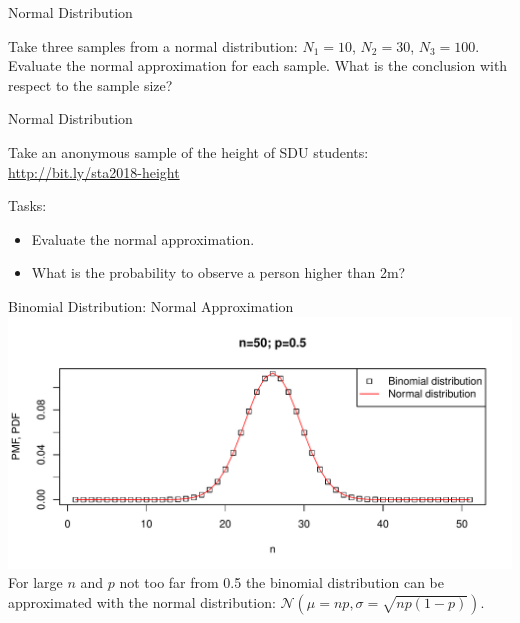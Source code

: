 \begin{frame}{Normal Distribution}
    \begin{example}
        \medskip
        Take three samples from a normal distribution: $N_1 = 10$, $N_2 = 30$, $N_3 = 100$. Evaluate the normal approximation for each sample. What is the conclusion with respect to the sample size?
    \end{example}
\end{frame}

\begin{frame}{Normal Distribution}
    \begin{example}
        \medskip
        Take an anonymous sample of the height of SDU students:\\
        \url{http://bit.ly/sta2018-height}
        
        Tasks:
        \begin{itemize}
            \item Evaluate the normal approximation.
            \item What is the probability to observe a person higher than 2m?
        \end{itemize}
    \end{example}
\end{frame}

\begin{frame}{Binomial Distribution: Normal Approximation}
    \includegraphics[width=\linewidth]{R/plots/norm_approx_to_binom}
    For large $n$ and $p$ not too far from 0.5 the binomial distribution can be approximated with the normal distribution:
    $\mathcal{N}\left( \mu = np, \sigma = \sqrt{np(1-p)} \right)$.
\end{frame}


